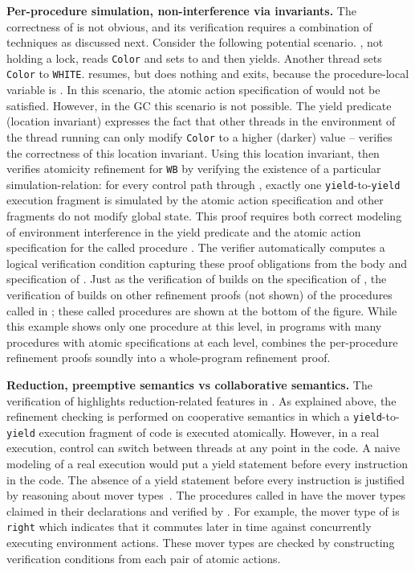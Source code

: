 {\bf Per-procedure simulation, non-interference via invariants.}
The correctness of  is not obvious, and its verification
requires a combination of techniques as discussed next. 
Consider the following potential scenario. 
, not holding a lock, reads {\tt Color} and
sets  to  and then yields. Another thread sets {\tt Color} to
{\tt WHITE}.  resumes, but does nothing and exits,
because the procedure-local variable  is . In this scenario, the atomic action
specification of  would not be satisfied. However, in the GC this
scenario is not possible. 
The yield predicate (location invariant) expresses the fact that
other threads in the environment of the thread running  can
only modify {\tt Color} to a higher (darker) value -- \civl verifies the correctness
of this location invariant.
Using this location invariant, \civl then verifies atomicity
refinement for {\tt WB} by verifying the existence of a particular simulation-relation:
for every control path through , exactly one {\tt yield}-to-{\tt yield} execution
fragment is simulated by the atomic action specification and other fragments do not modify
global state. 
This proof requires both correct modeling of environment interference in the yield predicate
and the atomic action specification for the called procedure .
The \civl verifier automatically computes a logical verification condition capturing
these proof obligations from the body and specification of .
Just as the verification of  builds on the specification of ,
the verification of  builds on other refinement proofs (not shown) 
of the procedures called in ;
these called procedures are shown at the bottom of the figure. 
While this example shows only one procedure at this level, in programs
with many procedures with atomic specifications at each level,
\civl combines the per-procedure refinement proofs soundly into a
whole-program refinement proof. 

{\bf Reduction, preemptive semantics vs collaborative semantics.}
The verification of  highlights reduction-related features
in \civl. 
As explained above, the refinement checking is performed on cooperative semantics in which a 
{\tt yield}-to-{\tt yield} execution fragment of code is executed atomically.
However, in a real execution, control can switch between threads at any point in the code. 
A naive modeling of a real execution would put a yield statement before every instruction in the code.
The absence of a yield statement before every instruction is justified by reasoning about mover types~\cite{FlanaganFLQ08}. 
The procedures called in  have the mover types claimed in their
declarations and verified by \civl. 
For example, the mover type of  is {\tt right} which indicates 
that it commutes later in time against concurrently executing environment actions.
These mover types are checked by constructing verification conditions from each pair of atomic actions.

